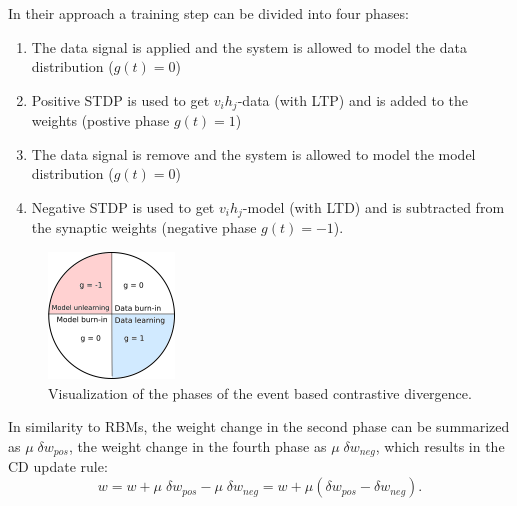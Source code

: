 In their approach a training step can be divided into four phases:
\begin{enumerate}
\item The data signal is applied and the system is allowed to model the data distribution ($g(t)=0$)
\item Positive STDP is used to get $v_i h_j$-data (with LTP) and is added to the weights (postive phase $g(t)=1$)
\item The data signal is remove and the system is allowed to model the model distribution ($g(t)=0$)
\item Negative STDP is used to get $v_i h_j$-model (with LTD) and is subtracted from the synaptic weights (negative phase $g(t)=-1$).
\end{enumerate}


\begin{figure}
	\centering
    	\includegraphics[width=0.3\textwidth]{imgs/eCD11.png} 
    \caption{Visualization of the phases of the event based contrastive divergence.}
	\label{fig:test}
\end{figure}

In similarity to RBMs, the weight change in the second phase can be summarized as $\mu \; \delta w_{pos}$, the weight change in the fourth phase as $\mu \; \delta w_{neg}$, which results in the CD update rule:
\[
w = w +  \mu \; \delta w_{pos} - \mu \; \delta w_{neg} = w +  \mu (\delta w_{pos} - \delta w_{neg}).
\]
 
